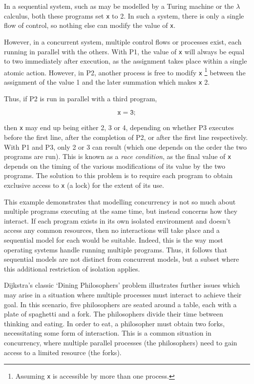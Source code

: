 In a sequential system, such as may be modelled by a Turing machine or the
$\lambda$ calculus, both these programs set \texttt{x} to 2.  In such a
system, there is only a single flow of control, so nothing else can
modify the value of \texttt{x}.

However, in a concurrent system, multiple control flows or processes
exist, each running in parallel with the others.  With P1, the value
of \texttt{x} will always be equal to two immediately after execution,
as the assignment takes place within a single atomic action.  However,
in P2, another process is free to modify \texttt{x} \footnote{Assuming
  \texttt{x} is accessible by more than one process.} between the
assignment of the value 1 and the later summation which makes
\texttt{x} 2.

Thus, if P2 is run in parallel with a third program,

\begin{equation}
\mathtt{x = 3;} \tag{P3}
\end{equation}

\noindent then \texttt{x} may end up being either 2, 3 or 4, depending
on whether P3 executes before the first line, after the completion of
P2, or after the first line respectively.  With P1 and P3, only 2 or 3
can result (which one depends on the order the two programs are run).
This is known as a \emph{race condition}, as the final value of
\texttt{x} depends on the timing of the various modifications of its
value by the two programs.  The solution to this problem is to require
each program to obtain exclusive access to \texttt{x} (a lock) for the
extent of its use.

This example demonstrates that modelling concurrency is not so much
about multiple programs executing at the same time, but instead
concerns how they interact.  If each program exists in its own
isolated environment and doesn't access any common resources, then no
interactions will take place and a sequential model for each would be
suitable.  Indeed, this is the way most operating systems handle
running multiple programs.  Thus, it follows that sequential models
are not distinct from concurrent models, but a subset where this
additional restriction of isolation applies.

Dijkstra's classic `Dining Philosophers' problem
\cite{dijkstra:philosophers} illustrates further issues which may
arise in a situation where multiple processes must interact to achieve
their goal.  In this scenario, five philosophers are seated around a
table, each with a plate of spaghetti and a fork.  The philosophers
divide their time between thinking and eating.  In order to eat, a
philosopher must obtain two forks, necessitating some form of
interaction.  This is a common situation in concurrency, where
multiple parallel processes (the philosophers) need to gain access to
a limited resource (the forks).

